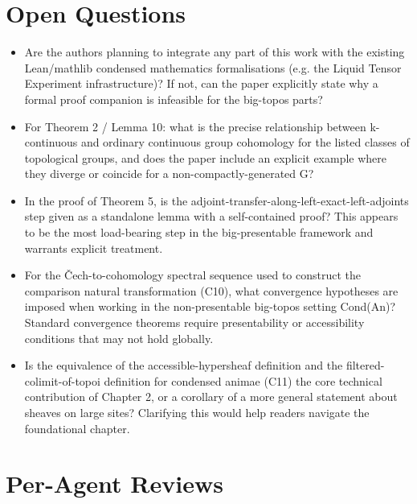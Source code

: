 \documentclass[11pt]{article}
\begin{document}
\section*{Open Questions}
\begin{itemize}[leftmargin=*]
  \item Are the authors planning to integrate any part of this work with the existing Lean/mathlib condensed mathematics formalisations (e.g. the Liquid Tensor Experiment infrastructure)? If not, can the paper explicitly state why a formal proof companion is infeasible for the big-topos parts?
  \item For Theorem 2 / Lemma 10: what is the precise relationship between k-continuous and ordinary continuous group cohomology for the listed classes of topological groups, and does the paper include an explicit example where they diverge or coincide for a non-compactly-generated G?
  \item In the proof of Theorem 5, is the adjoint-transfer-along-left-exact-left-adjoints step given as a standalone lemma with a self-contained proof? This appears to be the most load-bearing step in the big-presentable framework and warrants explicit treatment.
  \item For the Čech-to-cohomology spectral sequence used to construct the comparison natural transformation (C10), what convergence hypotheses are imposed when working in the non-presentable big-topos setting Cond(An)? Standard convergence theorems require presentability or accessibility conditions that may not hold globally.
  \item Is the equivalence of the accessible-hypersheaf definition and the filtered-colimit-of-topoi definition for condensed animae (C11) the core technical contribution of Chapter 2, or a corollary of a more general statement about sheaves on large sites? Clarifying this would help readers navigate the foundational chapter.
\end{itemize}

\section*{Per-Agent Reviews}
\end{document}
